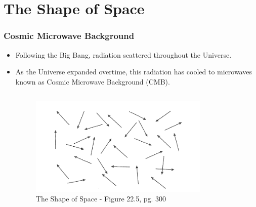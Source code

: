 \documentclass[13pt]{beamer}
\begin{document}
\section{The Shape of Space} %
\begin{frame}
\frametitle{Cosmic Microwave Background}
  \begin{itemize}
    \item Following the Big Bang, radiation scattered throughout the Universe.
    \item As the Universe expanded overtime, this radiation has cooled to microwaves known as \alert{Cosmic Microwave Background (CMB)}.

    \begin{columns}[c] %
     \centering
      \begin{figure}
        \includegraphics[height=4.75cm]{./img/cmbwaves} %
        \caption{The Shape of Space - Figure 22.5, pg. 300}
      \end{figure}
  \end{columns}

  \end{itemize}
\end{frame}
\end{document}
